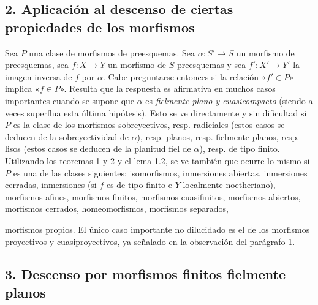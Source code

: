 \documentclass[11pt,twoside,openany]{book}
\numberwithin{equation}{section}
\newcommand{\src}[1]{%
  \phantomsection\hypertarget{src:#1}{}%
  \marginpar{\raggedleft\footnotesize\sffamily #1}%
}
\theoremstyle{plain}
\theoremstyle{definition}
\theoremstyle{remark}
\newcommand{\FgaUnitKey}{frontmatter}
\renewcommand{\src}[1]{%
  \phantomsection\hypertarget{src:\FgaUnitKey:#1}{}%
  \marginpar{\raggedleft\footnotesize\sffamily #1}%
}
\theoremstyle{plain}
\theoremstyle{definition}
\theoremstyle{remark}
\begin{document}
\subsection*{2. Aplicación al descenso de ciertas propiedades de los morfismos}

Sea $P$ una clase de morfismos de preesquemas. Sea
$\alpha:S'\longrightarrow S$ un morfismo de preesquemas, sea
$f:X\longrightarrow Y$ un morfismo de $S$-preesquemas y sea
$f':X'\longrightarrow Y'$ la imagen inversa de $f$ por $\alpha$. Cabe
preguntarse entonces si la relación «$f'\in P$» implica «$f\in P$». Resulta que
la respuesta es afirmativa en muchos casos importantes cuando se supone que
$\alpha$ es \emph{fielmente plano y cuasicompacto} (siendo a veces superflua
esta última hipótesis). Esto se ve directamente y sin dificultad si $P$ es la
clase de los morfismos sobreyectivos, resp. radiciales (estos casos se deducen
de la sobreyectividad de $\alpha$), resp. planos, resp. fielmente planos, resp.
lisos (estos casos se deducen de la planitud fiel de $\alpha$), resp. de tipo
finito. Utilizando los teoremas 1 y 2 y el lema 1.2, se ve también que ocurre
lo mismo si $P$ es una de las clases siguientes: isomorfismos, inmersiones
abiertas, inmersiones cerradas, inmersiones (si $f$ es de tipo finito e $Y$
localmente noetheriano), morfismos afines, morfismos finitos, morfismos
cuasifinitos, morfismos abiertos, morfismos cerrados, homeomorfismos, morfismos
separados,

\src{319}
morfismos propios. El único caso importante no dilucidado es el de los
morfismos proyectivos y cuasiproyectivos, ya señalado en la observación del
parágrafo 1.

\subsection*{3. Descenso por morfismos finitos fielmente planos}
\end{document}
